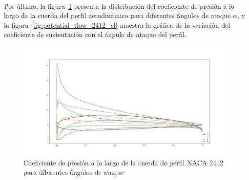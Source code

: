 \documentclass[letterpaper, openright, 12pt]{book}
\begin{document}
    \paragraph*{}
    Por último, la figura~\ref{fig:potential_flow_2412_cp_dist} presenta la
    distribución del coeficiente de presión a lo largo de la cuerda del perfil
    aerodinámico para diferentes ángulos de ataque $\alpha$, y la
    figura~\ref{fig:potential_flow_2412_cl} muestra la gráfica de la variación
    del coeficiente de sustentación con el ángulo de ataque del perfil.
    \begin{figure}[H]%
        \centering
        \includegraphics[keepaspectratio,
            width=138mm]{./Imagenes/potential_flow_2412_cps}
        \caption[Coeficiente de presión a lo largo de la cuerda de perfil NACA 2412]
        {Coeficiente de presión a lo largo de la cuerda de perfil NACA 2412 para
            diferentes ángulos de ataque}
        \label{fig:potential_flow_2412_cp_dist}
    \end{figure}
\end{document}
